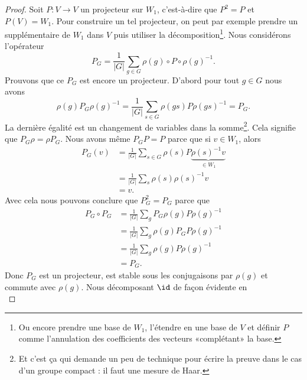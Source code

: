 \begin{proof}
	Soit \( P\colon V\to V\) un projecteur sur \( W_1\), c'est-à-dire que \( P^2=P\) et \( P(V)=W_1\). Pour construire un tel projecteur, on peut par exemple prendre un supplémentaire de \( W_1\) dans \( V\) puis utiliser la décomposition\footnote{Ou encore prendre une base de \( W_1\), l'étendre en une base de \( V\) et définir \( P\) comme l'annulation des coefficients des vecteurs «complétant» la base.}. Nous considérons l'opérateur
	\begin{equation}
		P_G=\frac{1}{ | G | }\sum_{g\in G}\rho(g)\circ P\circ \rho(g)^{-1}.
	\end{equation}
	Prouvons que ce \( P_G\) est encore un projecteur. D'abord pour tout \( g\in G\) nous avons
	\begin{equation}
		\rho(g)P_G\rho(g)^{-1}=\frac{1}{ | G | }\sum_{s\in G}\rho(gs)P\rho(gs)^{-1}=P_G.
	\end{equation}
	La dernière égalité est un changement de variables dans la somme\footnote{Et c'est ça qui demande un peu de technique pour écrire la preuve dans le cas d'un groupe compact : il faut une mesure de Haar.}. Cela signifie que \( P_G\rho=\rho P_G\). Nous avons même \( P_GP=P\) parce que si \( v\in W_1\), alors
	\begin{subequations}
		\begin{align}
			P_G(v) & =\frac{1}{ | G | }\sum_{s\in G}\rho(s)P\underbrace{\rho(s)^{-1} v}_{\in W_1} \\
			       & =\frac{1}{ | G | }\sum_s\rho(s)\rho(s)^{-1} v                                \\
			       & =v.
		\end{align}
	\end{subequations}
	Avec cela nous pouvons conclure que \( P_G^2=P_G\) parce que
	\begin{subequations}
		\begin{align}
			P_G\circ P_G & =\frac{1}{ | G | }\sum_g P_G\rho(g)P\rho(g)^{-1} \\
			             & =\frac{1}{ | G | }\sum_g \rho(g)P_GP\rho(g)^{-1} \\
			             & =\frac{1}{ | G | }\sum_g \rho(g)P\rho(g)^{-1}    \\
			             & =P_G.
		\end{align}
	\end{subequations}
	Donc \( P_G\) est un projecteur, est stable sous les conjugaisons par \( \rho(g)\) et commute avec \( \rho(g)\). Nous décomposant \( \id\) de façon évidente en
	\begin{equation}

\end{equation}
\end{proof}
